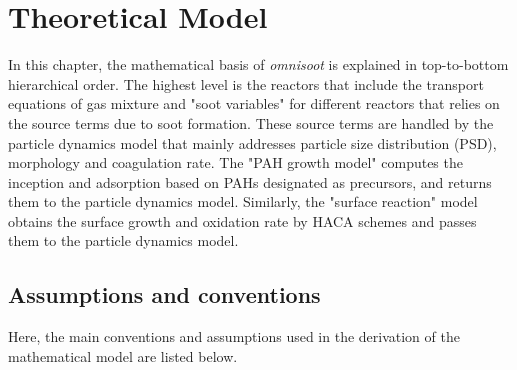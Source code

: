 \chapter{Theoretical Model}
In this chapter, the mathematical basis of \textit{omnisoot} is explained in top-to-bottom hierarchical order. The highest level is the reactors that include the transport equations of gas mixture and "soot variables" for different reactors that relies on the source terms due to soot formation. These source terms are handled by the particle dynamics model that mainly addresses particle size distribution (PSD), morphology and coagulation rate. The "PAH growth model" computes the inception and adsorption based on PAHs designated as precursors, and returns them to the particle dynamics model. Similarly, the "surface reaction" model obtains the surface growth and oxidation rate by HACA schemes and passes them to the particle dynamics model. 

\section{Assumptions and conventions}
Here, the main conventions and assumptions used in the derivation of the mathematical model are listed below.

